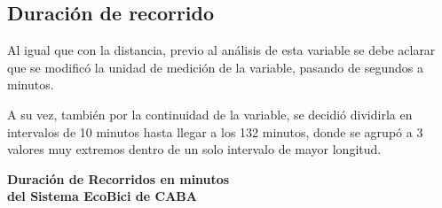 \documentclass[11pt]{article}
\begin{document}
    \subsection{Duraci\'on de recorrido}

    Al igual que con la distancia, previo al an\'alisis de esta variable se debe aclarar
    que se modific\'o la unidad de medici\'on de la variable, pasando de segundos a minutos. 

    A su vez, tambi\'en por la continuidad de la variable, se decidi\'o dividirla en intervalos de 
    10 minutos hasta llegar a los 132 minutos, donde se agrup\'o a 3 valores muy extremos dentro de un solo intervalo de mayor longitud. 

    \vspace{7mm}

    \begin{center}
      \large\textbf{Duraci\'on de Recorridos en minutos \\ del Sistema EcoBici de CABA}
    \end{center}
\end{document}
